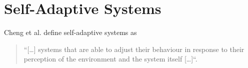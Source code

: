 

    \section{Self-Adaptive Systems}
    \label{sec:self-adaptive}
    
    Cheng et al. define self-adaptive systems as
    \begin{quotation}
        ``[\ldots] systems that are able to adjust their behaviour in response to their perception of the environment and the
        system itself [\ldots]``\cite[p.1]{Cheng:2009:SES:1573856.1573858}.
    \end{quotation}
    
